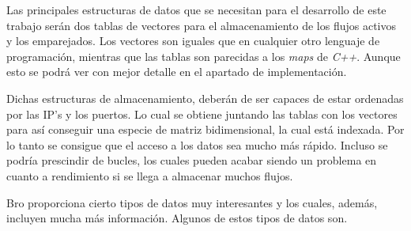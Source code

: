 Las principales estructuras de datos que se necesitan para el desarrollo de este trabajo serán dos 
tablas \cite{brotable} de 
vectores para el almacenamiento de los flujos activos y los emparejados. Los vectores son iguales que en cualquier 
otro lenguaje de programación, mientras que las tablas son parecidas a los \textit{maps} de \textit{C++}. Aunque 
esto se podrá ver con mejor detalle en el apartado de implementación.

\intro Dichas estructuras de almacenamiento, deberán de ser capaces de estar ordenadas por las IP's y los puertos. 
Lo cual se obtiene juntando las tablas con los vectores para así conseguir una especie de matriz bidimensional, 
la cual está indexada. Por lo tanto se consigue que el acceso a los datos sea mucho más rápido. Incluso se podría 
prescindir de bucles, los cuales pueden acabar siendo un problema en cuanto a rendimiento si se llega a almacenar 
muchos flujos.

\intro Bro proporciona cierto tipos de datos muy interesantes y los cuales, además, incluyen mucha más información. 
Algunos de estos tipos de datos son. 

